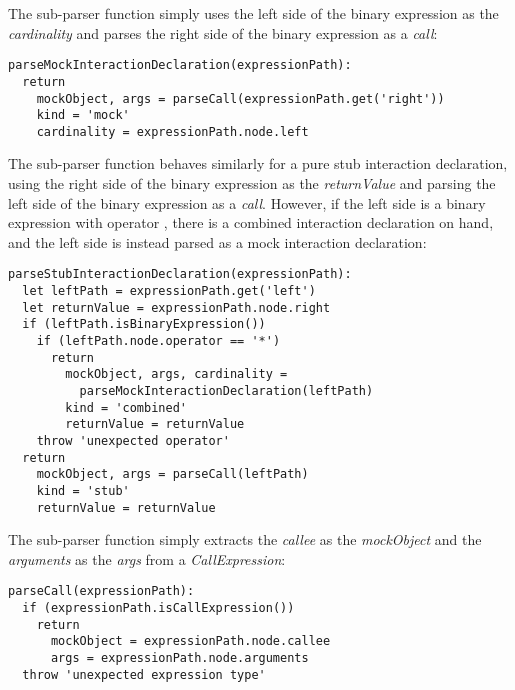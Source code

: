 The sub-parser function  simply
uses the left side of the binary expression as the \textit{cardinality}
and parses the right side of the binary expression as a \textit{call}:
\begin{verbatim}
parseMockInteractionDeclaration(expressionPath):
  return
    mockObject, args = parseCall(expressionPath.get('right'))
    kind = 'mock'
    cardinality = expressionPath.node.left
\end{verbatim}

The sub-parser function 
behaves similarly for a pure stub interaction declaration,
using the right side of the binary expression as the \textit{returnValue}
and parsing the left side of the binary expression as a \textit{call}.
However, if the left side is a binary expression with operator ,
there is a combined interaction declaration on hand,
and the left side is instead parsed as a mock interaction declaration:
\begin{verbatim}
parseStubInteractionDeclaration(expressionPath):
  let leftPath = expressionPath.get('left')
  let returnValue = expressionPath.node.right
  if (leftPath.isBinaryExpression())
    if (leftPath.node.operator == '*')
      return
        mockObject, args, cardinality =
          parseMockInteractionDeclaration(leftPath)
        kind = 'combined'
        returnValue = returnValue
    throw 'unexpected operator'
  return
    mockObject, args = parseCall(leftPath)
    kind = 'stub'
    returnValue = returnValue
\end{verbatim}

The sub-parser function 
simply extracts the \textit{callee} as the \textit{mockObject}
and the \textit{arguments} as the \textit{args}
from a \textit{CallExpression}:
\begin{verbatim}
parseCall(expressionPath):
  if (expressionPath.isCallExpression())
    return
      mockObject = expressionPath.node.callee
      args = expressionPath.node.arguments
  throw 'unexpected expression type'
\end{verbatim}
